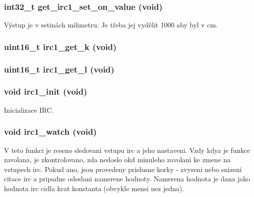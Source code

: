 \subsubsection[{get\_\-irc1\_\-set\_\-on\_\-value}]{\setlength{\rightskip}{0pt plus 5cm}int32\_\-t get\_\-irc1\_\-set\_\-on\_\-value (void)}\label{irc_8h_a96221cc1f6e45c778e3909ff5d860b2d}


Výstup je v setinách milimetru. Je třeba jej vydělit 1000 aby byl v cm. 
\subsubsection[{irc1\_\-get\_\-k}]{\setlength{\rightskip}{0pt plus 5cm}uint16\_\-t irc1\_\-get\_\-k (void)}\label{irc_8h_a72331a5215368486b6e9eb068e0ea1b1}
\subsubsection[{irc1\_\-get\_\-l}]{\setlength{\rightskip}{0pt plus 5cm}uint16\_\-t irc1\_\-get\_\-l (void)}\label{irc_8h_acaa3b31cea039569b81247a457c0263e}
\subsubsection[{irc1\_\-init}]{\setlength{\rightskip}{0pt plus 5cm}void irc1\_\-init (void)}\label{irc_8h_aa50caede5ea4ec03d972071a3ba60955}
Inicializace IRC. 
\subsubsection[{irc1\_\-watch}]{\setlength{\rightskip}{0pt plus 5cm}void irc1\_\-watch (void)}\label{irc_8h_a1bce3e604934651f923c84b7fda5c6f6}
V teto funkci je reseno sledovani vstupu irc a jeho nastaveni. Vzdy kdyz je funkce zavolana, je zkontrolovano, zda nedoslo okd minuleho zavolani ke zmene na vstupech irc. Pokud ano, jsou provedeny prislusne korky -\/ zvyseni nebo snizeni citace irc a pripadne odeslani namerene hodnoty. Namerena hodnota je dana jako hodnota irc cidla krat konstanta (obvykle mensi nez jedna). 
